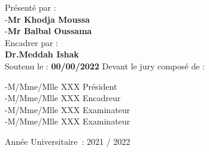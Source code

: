 \begin{titlepage}
\begin{center}
        
        Présenté par : \\
        -\textbf{Mr Khodja Moussa} \\
        -\textbf{Mr Balbal Oussama} \\
        
        
        Encadrer par : \\
        \textbf{Dr.Meddah Ishak} \\		

        Soutenu le : \textbf{00/00/2022} Devant le jury composé de :\\
    \end{center}
        -M/Mme/Mlle XXX Président \\
        -M/Mme/Mlle XXX Encadreur \\
        -M/Mme/Mlle XXX Examinateur \\
        -M/Mme/Mlle XXX Examinateur \\
    
    \begin{center}
        \vfill
        Année Universitaire : 2021 / 2022
    \end{center}
\end{titlepage}
